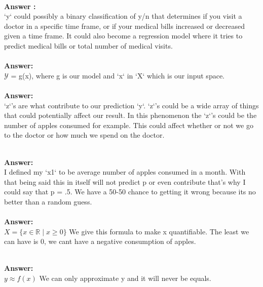 \documentclass[12pt]{article}
\begin{document}
\begin{enumerate}
\\
\textbf{Answer :} \\
`y` could possibly a binary classification of y/n that determines if you visit a doctor in a specific time frame, or if your medical bills increased or decreased given a time frame. It could also become a regression model where it tries to predict medical bills or total number of medical visits. \\

\\
\textbf{Answer: } \\ 
$\mathcal{Y}$ = g(x), where g is our model and `x` in `X` which is our input space. \\ 

\\ 
\textbf{Answer: } \\ 
`z`'s are what contribute to our prediction `y`. `z`'s could be a wide array of things that could potentially affect our result. In this phenomenon the `z`'s could be the number of apples consumed for example. This could affect whether or not we go to the doctor or how much we spend on the doctor.

\\ 
\textbf{Answer: } \\ 
I defined my `x1` to be average number of apples consumed in a month. With that being said this in itself will not predict p or even contribute that's why I could say that p = .5. We have a 50-50 chance to getting it wrong because its no better than a random guess. \\ 


\\ 
\textbf{Answer: }\\
$X = \{ x \in \mathbb{R} \mid x \geq 0 \}$ We give this formula to make x quantifiable. The least we can have is 0, we cant have a negative consumption of apples.

\\
\textbf{Answer: } \\ 
$y \approx f(x)$  We can only approximate y and it will never be equals. \\ 



\end{enumerate}
\end{document}
